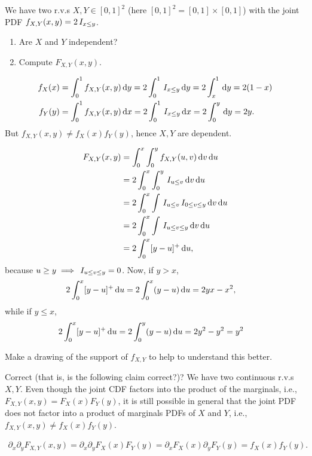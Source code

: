 \documentclass[../../assignments/assignments]{subfiles}
\begin{document}
\begin{exercise}
We have two r.v.s $X, Y \in [0,1]^{2}$ (here $[0,1]^{2} = [0,1]\times [0,1]$) with the joint PDF $f_{X,Y}(x,y) = 2 \,I_{x\leq y}$.
\begin{enumerate}
\item Are $X$ and $Y$ independent?
\item Compute $F_{X,Y}(x,y)$.
\end{enumerate}
\begin{solution}
\begin{align}
f_{X}(x) &= \int_{0}^{1} f_{X,Y}(x,y) \,\textrm{d}y = 2\int_{0}^{1} \,I_{x\leq y} \,\textrm{d}y = 2\int_{x}^{1} \,\textrm{d}y = 2(1-x) \\
f_{Y}(y) &= \int_{0}^{1} f_{X,Y}(x,y) \,\textrm{d}x = 2\int_{0}^{1} \,I_{x\leq y} \,\textrm{d}x = 2\int_{0}^{y} \,\textrm{d}y = 2 y.
\end{align}
But $f_{X,Y}(x,y) \neq f_{X}(x)f_{Y}(y)$, hence $X,Y$ are dependent.

\begin{align}
F_{X,Y}(x,y)
&= \int_{0}^{x}\int_{0}^{y} f_{X,Y}(u,v) \,\textrm{d}v \,\textrm{d}u \\
&= 2\int_{0}^{x}\int_{0}^{y} \,I_{u\leq v} \,\textrm{d}v \,\textrm{d}u \\
&= 2\int_{0}^{x}\int \,I_{u\leq v} \,I_{0\leq v \leq y}\,\textrm{d}v \,\textrm{d}u \\
&= 2\int_{0}^{x}\int  \,I_{u\leq v \leq y}\,\textrm{d}v \,\textrm{d}u \\
&= 2\int_{0}^{x} [y-u]^{+} \,\textrm{d}u,
\end{align}
because $u\geq y \implies \,I_{u\leq v \leq y} = 0$. Now, if $y>x$,
\begin{align}
  2\int_{0}^{x} [y-u]^{+} \,\textrm{d}u &=
  2\int_{0}^{x} (y-u) \,\textrm{d}u = 2 y x - x^{2},
\end{align}
while if $y\leq x$,
\begin{align}
  2\int_{0}^{x} [y-u]^{+} \,\textrm{d}u &=
  2\int_{0}^{y} (y-u) \,\textrm{d}u = 2 y^{2} - y^{2} = y^{2}
\end{align}

Make a drawing of the support of $f_{X,Y}$ to help to understand this better.

\end{solution}
\end{exercise}

\begin{exercise}
Correct (that is, is the following claim correct?)?
We have two continuous r.v.s $X, Y$.
Even though the joint CDF factors into the product of the marginals, i.e., $F_{X,Y}(x,y) = F_X(x)F_Y(y)$, it is still possible in general that the joint PDF does not factor into a product of marginals PDFs of $X$ and $Y$, i.e., $f_{X,Y}(x,y) \neq f_X(x) f_Y(y)$.
\begin{solution}
\begin{align*}
\partial_{x}\partial_{y}F_{X,Y}(x,y)
=\partial_{x}\partial_{y}F_{X}(x) F_{Y}(y)
=\partial_{x}F_{X}(x) \partial_{y} F_{Y}(y) = f_{X}(x) f_{Y}(y).
\end{align*}
\end{solution}
\end{exercise}
\end{document}
